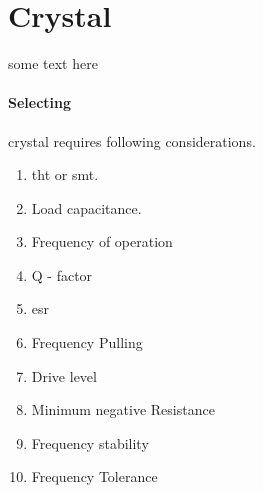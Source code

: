\section{Crystal}
		some text here
		
		\paragraph{Selecting} crystal requires following considerations.
		\begin{enumerate}
				\item \gls{tht} or \gls{smt}.
				\item Load capacitance.
				\item Frequency of operation
				\item Q - factor
				\item \gls{esr}
				\item Frequency Pulling
				\item Drive level
				\item Minimum negative Resistance
				\item Frequency stability
				\item Frequency Tolerance
		\end{enumerate}
		\blankpage